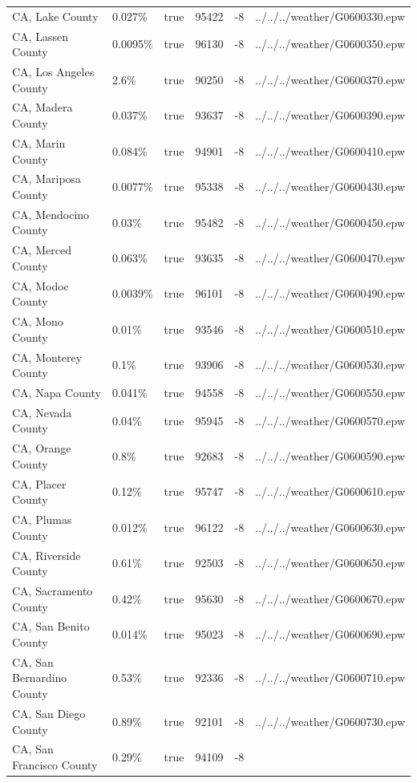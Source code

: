 \begin{longtable}[]{@{}llllll@{}}
CA, Lake County & 0.027\% & true & 95422 & -8 &
../../../weather/G0600330.epw \\
CA, Lassen County & 0.0095\% & true & 96130 & -8 &
../../../weather/G0600350.epw \\
CA, Los Angeles County & 2.6\% & true & 90250 & -8 &
../../../weather/G0600370.epw \\
CA, Madera County & 0.037\% & true & 93637 & -8 &
../../../weather/G0600390.epw \\
CA, Marin County & 0.084\% & true & 94901 & -8 &
../../../weather/G0600410.epw \\
CA, Mariposa County & 0.0077\% & true & 95338 & -8 &
../../../weather/G0600430.epw \\
CA, Mendocino County & 0.03\% & true & 95482 & -8 &
../../../weather/G0600450.epw \\
CA, Merced County & 0.063\% & true & 93635 & -8 &
../../../weather/G0600470.epw \\
CA, Modoc County & 0.0039\% & true & 96101 & -8 &
../../../weather/G0600490.epw \\
CA, Mono County & 0.01\% & true & 93546 & -8 &
../../../weather/G0600510.epw \\
CA, Monterey County & 0.1\% & true & 93906 & -8 &
../../../weather/G0600530.epw \\
CA, Napa County & 0.041\% & true & 94558 & -8 &
../../../weather/G0600550.epw \\
CA, Nevada County & 0.04\% & true & 95945 & -8 &
../../../weather/G0600570.epw \\
CA, Orange County & 0.8\% & true & 92683 & -8 &
../../../weather/G0600590.epw \\
CA, Placer County & 0.12\% & true & 95747 & -8 &
../../../weather/G0600610.epw \\
CA, Plumas County & 0.012\% & true & 96122 & -8 &
../../../weather/G0600630.epw \\
CA, Riverside County & 0.61\% & true & 92503 & -8 &
../../../weather/G0600650.epw \\
CA, Sacramento County & 0.42\% & true & 95630 & -8 &
../../../weather/G0600670.epw \\
CA, San Benito County & 0.014\% & true & 95023 & -8 &
../../../weather/G0600690.epw \\
CA, San Bernardino County & 0.53\% & true & 92336 & -8 &
../../../weather/G0600710.epw \\
CA, San Diego County & 0.89\% & true & 92101 & -8 &
../../../weather/G0600730.epw \\
CA, San Francisco County & 0.29\% & true & 94109 & -8 &

\end{longtable}
